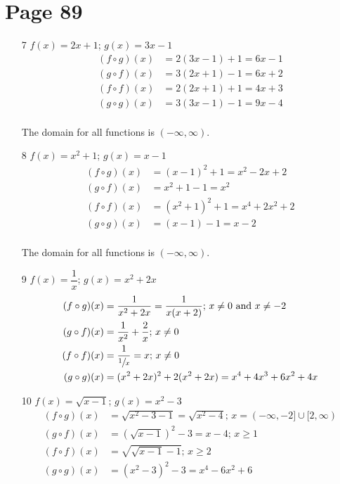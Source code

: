 \documentclass[fleqn,addpoints]{exam}
\begin{document}
\section{Page 89}
\begin{itemize}

\item[7]
$f(x) = 2x+1$; $g(x) = 3x-1$
\begin{align*}
  (f \circ g)(x) &= 2(3x-1) + 1 = 6x-1 \\
  (g \circ f)(x) &= 3(2x+1)-1 = 6x+2 \\
  (f \circ f)(x) &= 2(2x+1) + 1 = 4x+3 \\
  (g \circ g)(x) &= 3(3x-1) - 1 = 9x-4 \\
\end{align*}

The domain for all functions is $(-\infty, \infty)$.

\item[8]
$f(x) = x^2+1$; $g(x) = x-1$
\begin{align*}
  (f \circ g)(x) &= (x-1)^2 + 1 = x^2-2x+2 \\
  (g \circ f)(x) &= x^2+1-1 = x^2 \\
  (f \circ f)(x) &= (x^2+1)^2+1 = x^4 + 2x^2+2 \\
  (g \circ g)(x) &= (x-1)-1 = x-2 \\
\end{align*}

The domain for all functions is $(-\infty, \infty)$.

\item[9]
$f(x) = \dfrac{1}{x}$; $g(x) = x^2+2x$
\begin{align*}
  (f \circ g)(x) &= \frac{1}{x^2+2x} = \frac{1}{x(x+2)}  \text{; $x \neq 0$ and $x \neq -2$} \\
  (g \circ f)(x) &= \frac{1}{x^2} + \frac{2}{x} \text{; $x \neq 0$} \\
  (f \circ f)(x) &= \frac{1}{\sfrac{1}{x}} = x \text{; $x \neq 0$}\\
  (g \circ g)(x) &= (x^2+2x)^2 + 2(x^2+2x) = x^4 + 4x^3 + 6x^2 + 4x\\
\end{align*}

\item[10]
$f(x) = \sqrt{x-1}$; $g(x) = x^2-3$
\begin{align*}
  (f \circ g)(x) &= \sqrt{x^2-3-1} = \sqrt{x^2-4} \text{; $x = (-\infty, -2] \cup [2, \infty)$} \\
  (g \circ f)(x) &= (\sqrt{x-1})^2 - 3 = x-4 \text{; $x \geq 1$} \\
  (f \circ f)(x) &= \sqrt{\sqrt{x-1} - 1} \text{; $x \geq 2$} \\
  (g \circ g)(x) &= (x^2-3)^2 - 3 = x^4-6x^2+6 \\
\end{align*}


\end{itemize}
\end{document}
